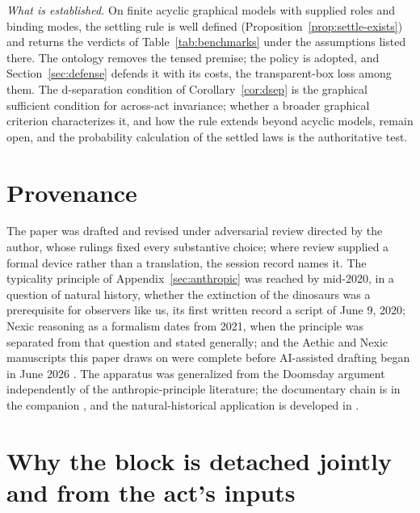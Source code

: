 \noindent\textit{What is established.} On finite acyclic graphical models with supplied roles and binding modes, the settling rule is well defined (Proposition~\ref{prop:settle-exists}) and returns the verdicts of Table~\ref{tab:benchmarks} under the assumptions listed there. The ontology removes the tensed premise; the policy is adopted, and Section~\ref{sec:defense} defends it with its costs, the transparent-box loss among them. The d-separation condition of Corollary~\ref{cor:dsep} is the graphical sufficient condition for across-act invariance; whether a broader graphical criterion characterizes it, and how the rule extends beyond acyclic models, remain open, and the probability calculation of the settled laws is the authoritative test.

\section*{Provenance} The paper was drafted and revised under adversarial review directed by the author, whose rulings fixed every substantive choice; where review supplied a formal device rather than a translation, the session record names it. %
The typicality principle of Appendix~\ref{sec:anthropic} was reached by mid-2020, in a question of natural history, whether the extinction of the dinosaurs was a prerequisite for observers like us, its first written record a script of June 9, 2020; Nexic reasoning as a formalism dates from 2021, when the principle was separated from that question and stated generally; and the Aethic and Nexic manuscripts this paper draws on were complete before AI-assisted drafting began in June 2026 \cite{Nexus}. The apparatus was generalized from the Doomsday argument \cite{gott1993implications, leslie1996end} independently of the anthropic-principle literature; the documentary chain is in the companion \cite{Nexus}, and the natural-historical application is developed in \cite{NexicFoundation}.

\appendix
\section{Why the block is detached jointly and from the act's inputs}\label{sec:withdrawn-operators}


